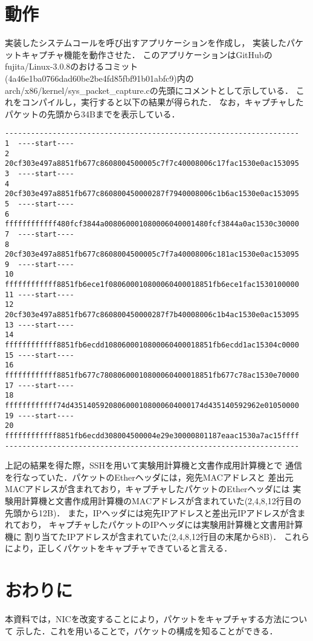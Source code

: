 \documentclass[12pt]{jsarticle}
\begin{document}
\section{動作}
実装したシステムコールを呼び出すアプリケーションを作成し，
実装したパケットキャプチャ機能を動作させた．
このアプリケーションはGitHubのfujita/Linux-3.0.8のおけるコミット
(4a46e1ba0766dad60be2be4fd85fbf91b01abfc9)内の
arch/x86/kernel/sys\_packet\_capture.cの先頭にコメントとして示している．
これをコンパイルし，実行すると以下の結果が得られた．
なお，キャプチャしたパケットの先頭から34Bまでを表示している．
\begin{verbatim}
--------------------------------------------------------------------
1  ----start----
2  20cf303e497a8851fb677c8608004500005c7f7c40008006c17fac1530e0ac153095
3  ----start----
4  20cf303e497a8851fb677c860800450000287f7940008006c1b6ac1530e0ac153095
5  ----start----
6  ffffffffffff480fcf3844a008060001080006040001480fcf3844a0ac1530c30000
7  ----start----
8  20cf303e497a8851fb677c8608004500005c7f7a40008006c181ac1530e0ac153095
9  ----start----
10 ffffffffffff8851fb6ece1f080600010800060400018851fb6ece1fac1530100000
11 ----start----
12 20cf303e497a8851fb677c860800450000287f7b40008006c1b4ac1530e0ac153095
13 ----start----
14 ffffffffffff8851fb6ecdd1080600010800060400018851fb6ecdd1ac15304c0000
15 ----start----
16 ffffffffffff8851fb677c78080600010800060400018851fb677c78ac1530e70000
17 ----start----
18 ffffffffffff74d4351405920806000108000604000174d435140592962e01050000
19 ----start----
20 ffffffffffff8851fb6ecdd308004500004e29e30000801187eaac1530a7ac15ffff
--------------------------------------------------------------------
\end{verbatim}
上記の結果を得た際，SSHを用いて実験用計算機と文書作成用計算機とで
通信を行なっていた．パケットのEtherヘッダには，宛先MACアドレスと
差出元MACアドレスが含まれており，キャプチャしたパケットのEtherヘッダには
実験用計算機と文書作成用計算機のMACアドレスが含まれていた(2,4,8,12行目の先頭から12B)．
また，IPヘッダには宛先IPアドレスと差出元IPアドレスが含まれており，
キャプチャしたパケットのIPヘッダには実験用計算機と文書用計算機に
割り当てたIPアドレスが含まれていた(2,4,8,12行目の末尾から8B)．
これらにより，正しくパケットをキャプチャできていると言える．

\section{おわりに}
本資料では，NICを改変することにより，パケットをキャプチャする方法について
示した．これを用いることで，パケットの構成を知ることができる．
\end{document}

